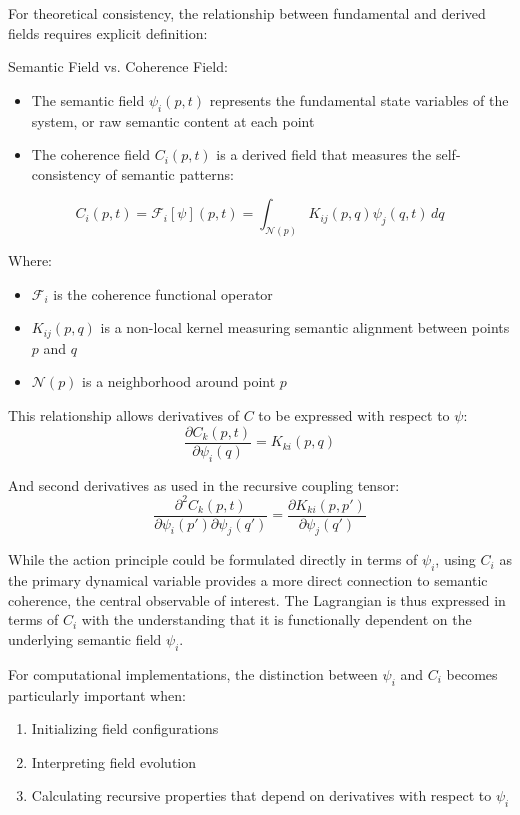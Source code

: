 For theoretical consistency, the relationship between fundamental and derived fields requires explicit definition:

Semantic Field vs. Coherence Field:
\begin{itemize}
    \item The semantic field \(\psi_i(p,t)\) represents the fundamental state variables of the system, or raw semantic content at each point
    \item The coherence field \(C_i(p,t)\) is a derived field that measures the self-consistency of semantic patterns:
\end{itemize}
\begin{equation}
C_i(p,t) = \mathcal{F}_i[\psi](p,t) = \int_{\mathcal{N}(p)} K_{ij}(p,q) \psi_j(q,t) \, dq
\end{equation}

Where:
\begin{itemize}
    \item \(\mathcal{F}_i\) is the coherence functional operator
    \item \(K_{ij}(p,q)\) is a non-local kernel measuring semantic alignment between points \(p\) and \(q\)
    \item \(\mathcal{N}(p)\) is a neighborhood around point \(p\)
\end{itemize}

This relationship allows derivatives of \(C\) to be expressed with respect to \(\psi\):
\begin{equation}
\frac{\partial C_k(p,t)}{\partial \psi_i(q)} = K_{ki}(p,q)
\end{equation}

And second derivatives as used in the recursive coupling tensor:
\begin{equation}
\frac{\partial^2 C_k(p,t)}{\partial \psi_i(p') \partial \psi_j(q')} = \frac{\partial K_{ki}(p,p')}{\partial \psi_j(q')}
\end{equation}

While the action principle could be formulated directly in terms of \(\psi_i\), using \(C_i\) as the primary dynamical variable provides a more direct connection to semantic coherence, the central observable of interest. The Lagrangian is thus expressed in terms of \(C_i\) with the understanding that it is functionally dependent on the underlying semantic field \(\psi_i\).

For computational implementations, the distinction between \(\psi_i\) and \(C_i\) becomes particularly important when:
\begin{enumerate}
    \item Initializing field configurations
    \item Interpreting field evolution
    \item Calculating recursive properties that depend on derivatives with respect to \(\psi_i\)
\end{enumerate}

